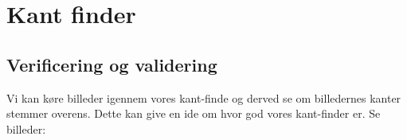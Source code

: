 \section{Kant finder}
\subsection{Verificering og validering}
Vi kan køre billeder igennem vores kant-finde og derved se om billedernes kanter stemmer overens.
Dette kan give en ide om hvor god vores kant-finder er.
Se billeder:
